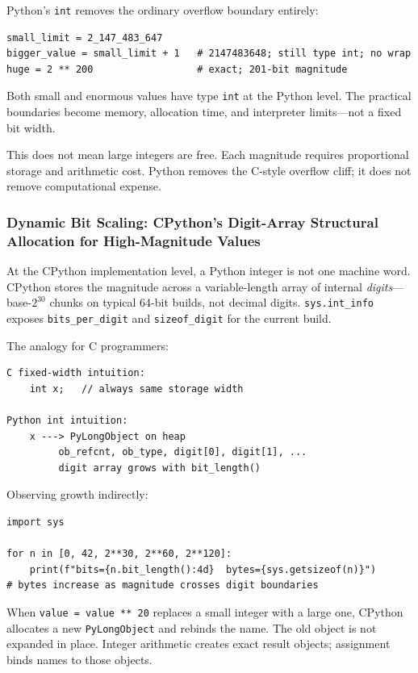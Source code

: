 \documentclass[a4paper,twoside]{report}
\begin{document}
Python's \texttt{int} removes the ordinary overflow boundary entirely:

\begin{verbatim}
small_limit = 2_147_483_647
bigger_value = small_limit + 1   # 2147483648; still type int; no wrap
huge = 2 ** 200                  # exact; 201-bit magnitude
\end{verbatim}

Both small and enormous values have type \texttt{int} at the Python level. The practical boundaries become memory, allocation time, and interpreter limits---not a fixed bit width.

This does not mean large integers are free. Each magnitude requires proportional storage and arithmetic cost. Python removes the C-style overflow cliff; it does not remove computational expense.

\subsubsection{Dynamic Bit Scaling: CPython's Digit-Array Structural Allocation for High-Magnitude Values}

At the CPython implementation level, a Python integer is not one machine word. CPython stores the magnitude across a variable-length array of internal \emph{digits}---base-\(2^{30}\) chunks on typical 64-bit builds, not decimal digits. \texttt{sys.int\_info} exposes \texttt{bits\_per\_digit} and \texttt{sizeof\_digit} for the current build.

The analogy for C programmers:

\begin{verbatim}
C fixed-width intuition:
    int x;   // always same storage width

Python int intuition:
    x ---> PyLongObject on heap
         ob_refcnt, ob_type, digit[0], digit[1], ...
         digit array grows with bit_length()
\end{verbatim}

Observing growth indirectly:

\begin{verbatim}
import sys

for n in [0, 42, 2**30, 2**60, 2**120]:
    print(f"bits={n.bit_length():4d}  bytes={sys.getsizeof(n)}")
# bytes increase as magnitude crosses digit boundaries
\end{verbatim}

When \texttt{value = value ** 20} replaces a small integer with a large one, CPython allocates a new \texttt{PyLongObject} and rebinds the name. The old object is not expanded in place. Integer arithmetic creates exact result objects; assignment binds names to those objects.
\end{document}
